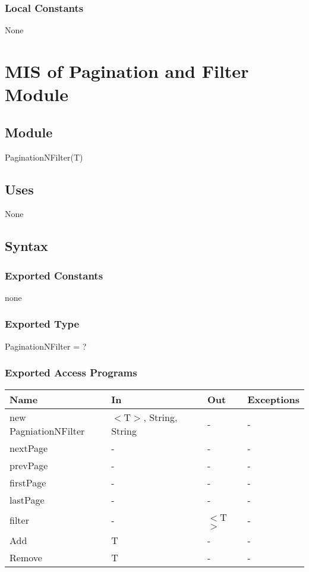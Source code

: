 \documentclass[12pt, titlepage]{article}
\begin{document}
\subsubsection{Local Constants}

None

\newpage

\section{MIS of Pagination and Filter Module} \label{mPF}

\subsection{Module}

PaginationNFilter(T)

\subsection{Uses}

None

\subsection{Syntax}

\subsubsection{Exported Constants}
none
\subsubsection{Exported Type}
PaginationNFilter = ?
\subsubsection{Exported Access Programs}
\begin{center}
\begin{tabular}{p{4cm} p{2cm} p{4cm} p{4cm}}
\hline
\textbf{Name} & \textbf{In} & \textbf{Out} & \textbf{Exceptions} \\
\hline
new PagniationNFilter & $<$T$>$, String, String & - & -\\
nextPage & - & - &  -\\
prevPage & - & - &  -\\
firstPage & - & - &  -\\
lastPage & - & - &  -\\
filter & - & $<$T$>$ & -\\
Add & T & - & - \\
Remove & T & - & - \\
\hline
\end{tabular}
\end{center}
\end{document}

